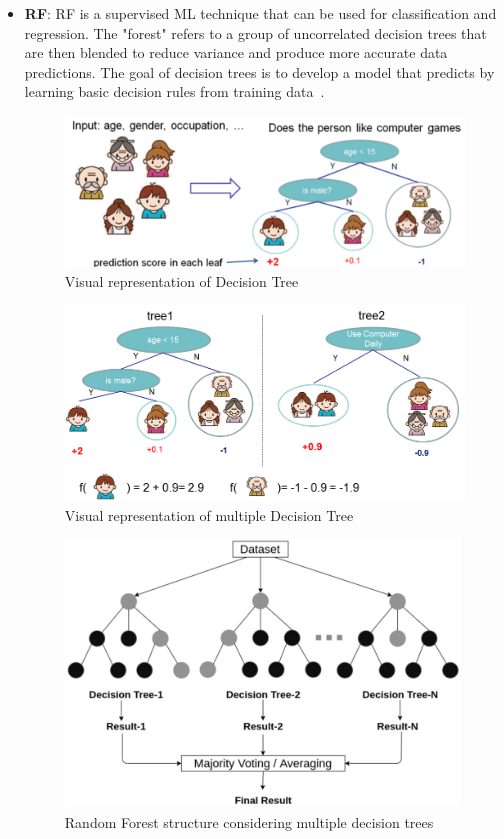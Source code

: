 \begin{itemize}
    \item \textbf{\gls{RF}}: \gls{RF} is a supervised \gls{ML} technique that can be used for classification and regression. The "forest" refers to a group of uncorrelated decision trees that are then blended to reduce variance and produce more accurate data predictions. The goal of decision trees is to develop a model that predicts by learning basic decision rules from training data~\cite{Chugh2018TypesKnow,2020WhatIBM}.
    
    \begin{figure}[htbp]
        \centering
        \includegraphics[width=0.70\linewidth]{Chapters/Figures/dt.png}
        \caption{Visual representation of Decision Tree~\cite{Rai2018XGBoostScience}}
        \label{fig:dt}
    \end{figure}
    \begin{figure}[htbp]
        \centering
        \includegraphics[width=0.70\linewidth]{Chapters/Figures/random_forest.png}
        \caption{Visual representation of multiple Decision Tree~\cite{Rai2018XGBoostScience}}
        \label{fig:random_forest}
    \end{figure}
    \begin{figure}[htbp]
        \centering
        \includegraphics[width=0.65\linewidth]{Chapters/Figures/random_forest_cavalo.png}
        \caption{Random Forest structure considering multiple decision trees~\cite{Sarker2021MachineDirections}}
        \label{fig:random_forest2}
    \end{figure}
    

\end{itemize}
